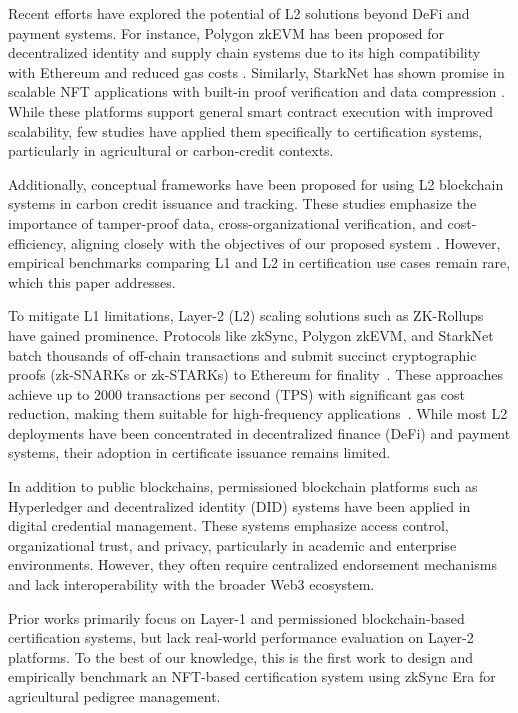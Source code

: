 \documentclass[pdflatex,sn-mathphys-num]{sn-jnl}
\begin{document}
Recent efforts have explored the potential of L2 solutions beyond DeFi and payment systems. For instance, Polygon zkEVM has been proposed for decentralized identity and supply chain systems due to its high compatibility with Ethereum and reduced gas costs \cite{polygon2024zkEVM}. Similarly, StarkNet has shown promise in scalable NFT applications with built-in proof verification and data compression \cite{starkware2024starknet}. While these platforms support general smart contract execution with improved scalability, few studies have applied them specifically to certification systems, particularly in agricultural or carbon-credit contexts.

Additionally, conceptual frameworks have been proposed for using L2 blockchain systems in carbon credit issuance and tracking. These studies emphasize the importance of tamper-proof data, cross-organizational verification, and cost-efficiency, aligning closely with the objectives of our proposed system \cite{merlo2025carbon,saraji2021carbon}. However, empirical benchmarks comparing L1 and L2 in certification use cases remain rare, which this paper addresses.

To mitigate L1 limitations, Layer-2 (L2) scaling solutions such as ZK-Rollups have gained prominence. Protocols like zkSync, Polygon zkEVM, and StarkNet batch thousands of off-chain transactions and submit succinct cryptographic proofs (zk-SNARKs or zk-STARKs) to Ethereum for finality~\cite{gupta2022zkp,zksync2022whitepaper}. These approaches achieve up to 2000 transactions per second (TPS) with significant gas cost reduction, making them suitable for high-frequency applications~\cite{zksyncdocs2024}. While most L2 deployments have been concentrated in decentralized finance (DeFi) and payment systems, their adoption in certificate issuance remains limited.

In addition to public blockchains, permissioned blockchain platforms such as Hyperledger and decentralized identity (DID) systems have been applied in digital credential management. These systems emphasize access control, organizational trust, and privacy, particularly in academic and enterprise environments. However, they often require centralized endorsement mechanisms and lack interoperability with the broader Web3 ecosystem.

Prior works primarily focus on Layer-1 and permissioned blockchain-based certification systems, but lack real-world performance evaluation on Layer-2 platforms. To the best of our knowledge, this is the first work to design and empirically benchmark an NFT-based certification system using zkSync Era for agricultural pedigree management.
\end{document}

